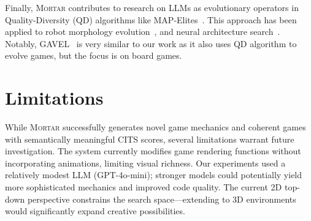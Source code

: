 \documentclass{article} %
\newcommand{\name}{\textsc{Mortar}}
\begin{document}
Finally, \name{} contributes to research on LLMs as evolutionary operators in Quality-Diversity (QD) algorithms like MAP-Elites~\citep{mouret2015illuminating}. This approach has been applied to robot morphology evolution~\citep{lehman2023evolution}, and neural architecture search~\citep{nasir2024llmatic}. Notably, GAVEL~\citep{todd2024gavel} is very similar to our work as it also uses QD algorithm to evolve games, but the focus is on board games.




\section{Limitations}

While \name{} successfully generates novel game mechanics and coherent games with semantically meaningful CITS scores, several limitations warrant future investigation. The system currently modifies game rendering functions without incorporating animations, limiting visual richness. Our experiments used a relatively modest LLM (GPT-4o-mini); stronger models could potentially yield more sophisticated mechanics and improved code quality. The current 2D top-down perspective constrains the search space—extending to 3D environments would significantly expand creative possibilities.
\end{document}
